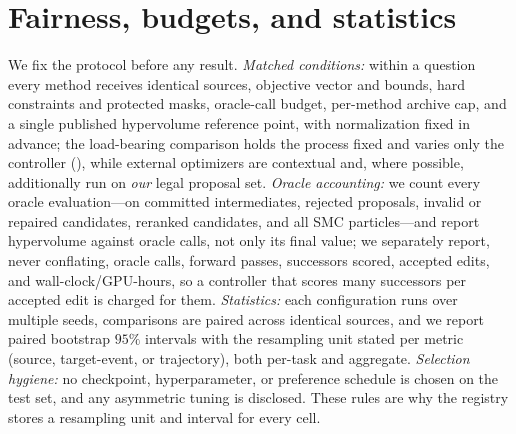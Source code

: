 \section{Fairness, budgets, and statistics}
\label{sec:fairness}

We fix the protocol before any result. \emph{Matched conditions:} within a question every method receives
identical sources, objective vector and bounds, hard constraints and protected masks, oracle-call budget,
per-method archive cap, and a single published hypervolume reference point, with normalization fixed in
advance; the load-bearing comparison holds the process fixed and varies only the controller
(), while external optimizers are contextual and, where possible, additionally run on
\emph{our} legal proposal set. \emph{Oracle accounting:} we count every oracle evaluation---on committed
intermediates, rejected proposals, invalid or repaired candidates, reranked candidates, and all SMC
particles---and report hypervolume against oracle calls, not only its final value; we separately report,
never conflating, oracle calls, forward passes, successors scored, accepted edits, and
wall-clock/GPU-hours, so a controller that scores many successors per accepted edit is charged for them.
\emph{Statistics:} each configuration runs over multiple seeds, comparisons are paired across identical
sources, and we report paired bootstrap $95\%$ intervals with the resampling unit stated per metric
(source, target-event, or trajectory), both per-task and aggregate. \emph{Selection hygiene:} no
checkpoint, hyperparameter, or preference schedule is chosen on the test set, and any asymmetric tuning is
disclosed. These rules are why the registry stores a resampling unit and interval for every cell.
